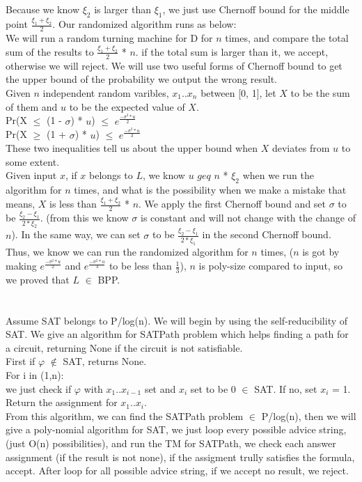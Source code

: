 \documentclass[11pt]{article}
\begin{document}
\part{} 
Because we know $\xi_{2}$ is larger than $\xi_{1}$, we just use Chernoff bound for the middle point $\frac{\xi_{1} + \xi_{2}}{2}$.
Our randomized algorithm runs as below: \\
We will run a random turning machine for D for $n$ times, and compare the total sum of the results to $\frac{\xi_{1} + \xi_{2}}{2}$ * $n$. if the total sum is larger than it, we accept, otherwise we will reject. We will use two useful forms of Chernoff bound to get the upper bound of the probability we output the wrong result. \\
Given $n$ independent random varibles, $x_{1}$..$x_{n}$ between [0, 1], let $X$ to be the sum of them and $u$ to be the expected value of $X$. \\
Pr(X $\leq$ (1 - $\sigma$) * $u$) $\leq$ $e^{\frac{-\sigma^{2}*u}{2}}$ \\
Pr(X $\geq$ (1 + $\sigma$) * $u$) $\leq$ $e^{\frac{-\sigma^{2}*u}{3}}$ \\
These two inequalities tell us about the upper bound when $X$ deviates from $u$ to some extent. \\
Given input $x$, if $x$ belongs to $L$, we know $u$ $geq$ $n$ * $\xi_{2}$ when we run the algorithm for $n$ times, and what is the possibility when we make a mistake that means, $X$ is less than $\frac{\xi_{1} + \xi_{2}}{2}$ * $n$. We apply the first Chernoff bound and set $\sigma$ to be $\frac{\xi_{2} - \xi_{1}}{2*\xi_{2}}$. (from this we know $\sigma$ is constant and will not change with the change of $n$). In the same way, we can set $\sigma$ to be $\frac{\xi_{2} - \xi_{1}}{2*\xi_{1}}$ in the second Chernoff bound. Thus, we know we can run the randomized algorithm for $n$ times, ($n$ is got by making $e^{\frac{-\sigma^{2}*u}{2}}$ and $e^{\frac{-\sigma^{2}*u}{3}}$ to be less than $\frac{1}{3}$), $n$ is poly-size compared to input, so we proved that $L$ $\in$ BPP.
\part{}
Assume SAT belongs to P/log(n). We will begin by using the self-reducibility of SAT. We give an algorithm for SATPath problem which helps finding a path for a circuit, returning None if the circuit is not satisfiable.\\
First if $\varphi$ $\notin$ SAT, returns None. \\
For i in (1,n): \\
	we just check if $\varphi$ with $x_{1}..x_{i-1}$ set and $x_{i}$ set to be 0 $\in$ SAT. If no, set $x_{i}$ = 1. \\
Return the assignment for $x_{1}..x_{i}$. \\
From this algorithm, we can find the SATPath problem $\in$ P/log(n), then we will give a poly-nomial algorithm for SAT, we just loop every possible advice string, (just O(n) possibilities), and run the TM for SATPath, we check each answer assignment (if the result is not none), if the assigment trully satisfies the formula, accept. After loop for all possible advice string, if we accept no result, we reject.
\end{document}
